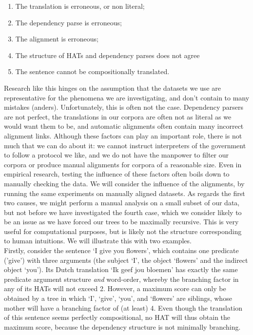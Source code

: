 \documentclass{report}
\theoremstyle{definition}
\theoremstyle{plain}
\begin{document}
\begin{enumerate}
\item The translation is erroneous, or non literal;
\item The dependency parse is erroneous;
\item The alignment is erroneous;
\item The structure of HATs and dependency parses does not agree
\item The sentence cannot be compositionally translated.
\end{enumerate}

Research like this hinges on the assumption that the datasets we use are representative for the phenomena we are investigating, and don't contain to many mistakes (anders). Unfortunately, this is often not the case. Dependency parsers are not perfect, the translations in our corpora are often not as literal as we would want them to be, and automatic alignments often contain many incorrect alignment links. Although these factors can play an important role, there is not much that we can do about it: we cannot instruct interpreters of the government to follow a protocol we like, and we do not have the manpower to filter our corpora or produce manual alignments for corpora of a reasonable size. Even in empirical research, testing the influence of these factors often boils down to manually checking the data. We will consider the influence of the alignments, by running the same experiments on manually aligned datasets. As regards the first two causes, we might perform a manual analysis on a small subset of our data, but not before we have investigated the fourth case, which we consider likely to be an issue as we have forced our trees to be maximally recursive. This is very useful for computational purposes, but is likely not the structure corresponding to human intuitions. We will illustrate this with two examples.\\
Firstly, consider the sentence `I give you flowers', which contains one predicate ('give') with three arguments (the subject `I', the object `flowers' and the indirect object `you'). Its Dutch translation `Ik geef jou bloemen' has exactly the same predicate argument structure \textit{and} word-order, whereby the branching factor in any of its HATs will not exceed 2. However, a maximum score can only be obtained by a tree in which `I', `give', `you', and `flowers' are siblings, whose mother will have a branching factor of (at least) 4. Even though the translation of this sentence seems perfectly compositional, no HAT will thus obtain the maximum score, because the dependency structure is not minimally branching.\\
\end{document}
